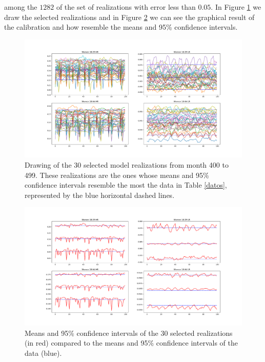 among the $1282$ of the set of realizations with error less than $0.05$. In Figure \ref{fig:laselegidas} we draw the selected realizations and in Figure \ref{fig:ajuste95IC} we can see the graphical result of the calibration and how resemble the means and 95\% confidence intervals.  

\begin{figure}[h!]
	\centering
	\includegraphics[width=\linewidth]{IMGs/1.-Calibrado/Selected.pdf}
	\caption{Drawing of the $30$ selected model realizations from month 400 to 499. These realizations are the ones whose means and 95\% confidence intervals resemble the most the data in Table \ref{datos}, represented by the blue horizontal dashed lines.}
	\label{fig:laselegidas}
\end{figure}

\begin{figure}[h!]
	\centering
	\includegraphics[width=\linewidth]{IMGs/1.-Calibrado/Ajuste_95IC.pdf}
	\caption{Means and 95\% confidence intervals of the $30$ selected realizations (in red) compared to the means and 95\% confidence intervals of the data (blue).}
	\label{fig:ajuste95IC}
\end{figure}

